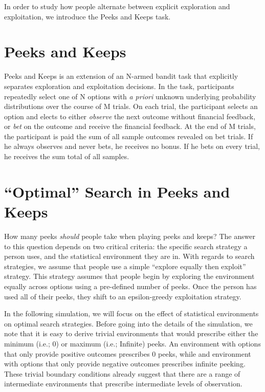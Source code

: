 \documentclass[a4paper,doc,natbib,floatsintext]{apa6}\usepackage[]{graphicx}\usepackage[]{color}
\begin{document}
In order to study how people alternate between explicit exploration and exploitation, we introduce the Peeks and Keeps task.


\section{Peeks and Keeps}

Peeks and Keeps is an extension of an N-armed bandit task that explicitly separates exploration and exploitation decisions. In the task, participants repeatedly select one of N options with \textit{a priori} unknown underlying probability distributions over the course of M trials. On each trial, the participant selects an option and elects to either \textit{observe} the next outcome without financial feedback, or \textit{bet} on the outcome and receive the financial feedback. At the end of M trials, the participant is paid the sum of all sample outcomes revealed on bet trials. If he always observes and never bets, he receives no bonus. If he bets on every trial, he receives the sum total of all samples.


\section{``Optimal'' Search in Peeks and Keeps}

How many peeks \textit{should} people take when playing peeks and keeps? The answer to this question depends on two critical criteria: the specific search strategy a person uses, and the statistical environment they are in. With regards to search strategies, 
we assume that people use a simple ``explore equally then exploit'' strategy. This strategy assumes that people begin by exploring the environment equally across options using a pre-defined number of peeks. Once the person has used all of their peeks, they shift to an epsilon-greedy exploitation strategy.

In the following simulation, we will focus on the effect of statistical environments on optimal search strategies. Before going into the details of the simulation, we note that it is easy to derive trivial environments that would prescribe either the minimum (i.e.; 0) or maximum (i.e.; Infinite) peeks. An environment with options that only provide positive outcomes prescribes 0 peeks, while and environment with options that only provide negative outcomes prescribes infinite peeking. These trivial boundary conditions already suggest that there are a range of intermediate environments that prescribe intermediate levels of observation.
\end{document}
